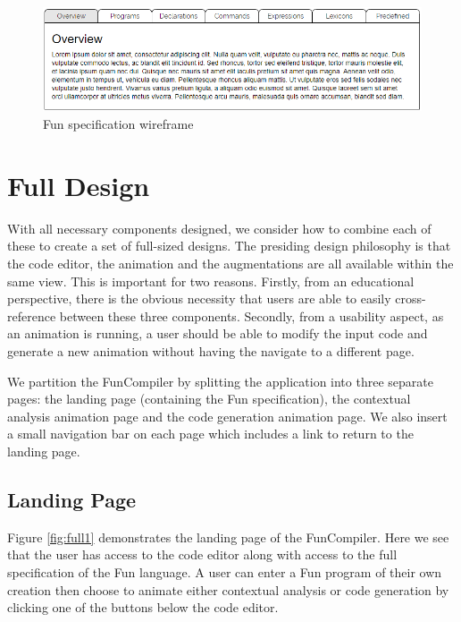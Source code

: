 \documentclass{l4proj}
\begin{document}
 \begin{figure}[h]
\centering
\includegraphics[scale=0.6]{images/specification-wireframe.png}
\caption{Fun specification wireframe}
\label{fig:fun-specification-wireframe}	
\end{figure}

\section{Full Design}
With all necessary components designed, we consider how to combine each of these to create a set of full-sized designs. The presiding design philosophy is that the code editor, the animation and the augmentations are all available within the same view. This is important for two reasons. Firstly, from an educational perspective, there is the obvious necessity that users are able to easily cross-reference between these three components. Secondly, from a usability aspect, as an animation is running, a user should be able to modify the input code and generate a new animation without having the navigate to a different page.

We partition the FunCompiler by splitting the application into three separate pages: the landing page (containing the Fun specification), the contextual analysis animation page and the code generation animation page. We also insert a small navigation bar on each page which includes a link to return to the landing page.

\subsection{Landing Page}
Figure \ref{fig:full1} demonstrates the landing page of the FunCompiler. Here we see that the user has access to the code editor along with access to the full specification of the Fun language. A user can enter a Fun program of their own creation then choose to animate either contextual analysis or code generation by clicking one of the buttons below the code editor.
\end{document}
